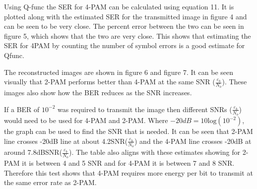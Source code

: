 \documentclass{article}
\begin{document}
Using Q-func the SER for 4-PAM can be calculated using equation 11. It is plotted along with the estimated SER for the transmitted image in figure 4 and can be seen to be very close. The percent error between the two can be seen in figure 5, which shows that the two are very close. This shows that estimating the SER for 4PAM by counting the number of symbol errors is a good estimate for Qfunc.

The reconstructed images are shown in figure 6 and figure 7. It can be seen visually that 2-PAM performs better than 4-PAM at the same SNR ($\frac{\varepsilon_b}{N_o}$). These images also show how the BER reduces as the SNR increases.

If a BER of $10^{-2}$ was required to transmit the image then different SNRs ($\frac{\varepsilon_b}{N_o}$) would need to be used for 4-PAM and 2-PAM. Where $-20dB = 10\text{log}(10^{-2})$, the graph can be used to find the SNR that is needed. It can be seen that 2-PAM line crosses -20dB line at about 4.2SNR($\frac{\varepsilon_b}{N_o}$) and the 4-PAM line crosses -20dB at around 7.8dBSNR($\frac{\varepsilon_b}{N_o}$). The table also aligns with these estimates showing for 2-PAM it is between 4 and 5 SNR and for 4-PAM it is between 7 and 8 SNR. Therefore this test shows that 4-PAM requires more energy per bit to transmit at the same error rate as 2-PAM. 
\end{document}
